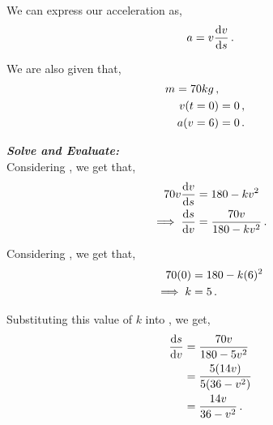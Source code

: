\begin{subquestions}
We can express our acceleration as,
\begin{equation}
	a = v\frac{\mathrm{d}v}{\mathrm{d}s} \label{2006:q6:AEqn1} \,.
\end{equation}

We are also given that,
\begin{align}
	m=70kg \,, \nonumber \\
	v(t=0) & = 0 \,, \nonumber \\
	a(v=6) & = 0 \label{2006:q6:AEqn2} \,.
\end{align}





\textbf{\textit{Solve and Evaluate:}} \\
Considering , we get that,
\begin{align}
	70v\frac{\mathrm{d}v}{\mathrm{d}s} & = 180-kv^2 \nonumber \\
	\implies \frac{\mathrm{d}s}{\mathrm{d}v} & = \frac{70v}{180-kv^2} \label{2006:q6:DEqn1} \,.
\end{align}

Considering , we get that,
\begin{align}
	70(0) & = 180 - k(6)^2 \nonumber \\
	\implies k & = 5  \,.
\end{align}

Substituting this value of $k$ into , we get,
\begin{align}
	\frac{\mathrm{d}s}{\mathrm{d}v} & = \frac{70v}{180-5v^2} \nonumber \\
	           & = \frac{5(14v)}{5(36-v^2)} \nonumber \\
	           & = \frac{14v}{36-v^2} \,.
\end{align} 

\end{subquestions}